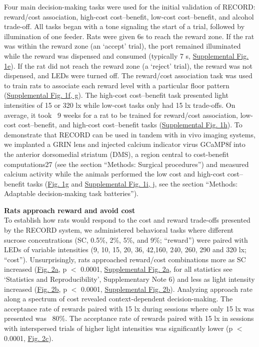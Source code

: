 \documentclass{article}
\begin{document}
Four main decision-making tasks were used for the initial validation of RECORD: reward/cost association, high-cost cost–benefit, low-cost cost–benefit, and alcohol trade-off. All tasks began with a tone signaling the start of a trial, followed by illumination of one feeder. Rats were given 6s to reach the reward zone. If the rat was within the reward zone (an ‘accept’ trial), the port remained illuminated while the reward was dispensed and consumed (typically 7 s, \hyperref[fig:Record_SI_1]{Supplemental Fig. 1e}). If the rat did not reach the reward zone (a ‘reject’ trial), the reward was not dispensed, and LEDs were turned off. The reward/cost association task was used to train rats to associate each reward level with a particular floor pattern (\hyperref[fig:Record_SI_1]{Supplemental Fig. 1f, g}). The high-cost cost–benefit task presented light intensities of 15 or 320 lx while low-cost tasks only had 15 lx trade-offs. On average, it took ~9 weeks for a rat to be trained for reward/cost association, low-cost cost–benefit, and high-cost cost–benefit tasks (\hyperref[fig:Record_SI_1]{Supplemental Fig. 1h}). To demonstrate that RECORD can be used in tandem with in vivo imaging systems, we implanted a GRIN lens and injected calcium indicator virus GCaMP8f into the anterior dorsomedial striatum (DMS), a region central to cost-benefit computations27 (see the section “Methods: Surgical procedures”) and measured calcium activity while the animals performed the low cost and high-cost cost–benefit tasks (\hyperref[fig:Record_main_1]{Fig. 1g} and \hyperref[fig:Record_SI_1]{Supplemental Fig. 1i, j}, see the section “Methods: Adaptable decision-making task batteries”).

\vspace{1em}

\noindent\textbf{Rats approach reward and avoid cost}\\
To establish how rats would respond to the cost and reward trade-offs presented by the RECORD system, we administered behavioral tasks where different sucrose concentrations (SC, 0.5\%, 2\%, 5\%, and 9\%; “reward”) were paired with LEDs of variable intensities (9, 10, 15, 20, 36, 42,160, 240, 260, 290 and 320 lx; “cost”). Unsurprisingly, rats approached reward/cost combinations more as SC increased (\hyperref[fig:Record_main_2]{Fig. 2a}, p $<$ 0.0001, \hyperref[fig:Record_SI_2]{Supplemental Fig. 2a}, for all statistics see ‘Statistics and Reproducibility’, Supplementary Note 6) and less as light intensity increased (\hyperref[fig:Record_main_2]{Fig. 2b}, p $<$ 0.0001, \hyperref[fig:Record_SI_2]{Supplemental Fig. 2b}). Analyzing approach rate along a spectrum of cost revealed context-dependent decision-making. The acceptance rate of rewards paired with 15 lx during sessions where only 15 lx was presented was ~80\%. The acceptance rate of rewards paired with 15 lx in sessions with interspersed trials of higher light intensities was significantly lower (p $<$ 0.0001, \hyperref[fig:Record_main_2]{Fig. 2c}).
\end{document}
